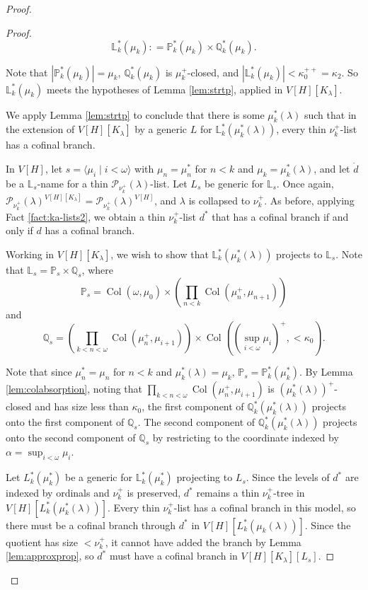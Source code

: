 \documentclass[psamsfonts]{amsart}
\theoremstyle{definition}
\newcommand{\defeq}{\mathrel{\mathop:}=}
\newcommand{\Q}{\mathbb{Q}}
\newcommand{\PP}{\mathbb{P}}
\newcommand{\LL}{\mathbb{L}}
\newcommand{\la}{\lambda}
\newcommand{\ka}{\kappa}
\newcommand{\w}{\omega}
\newcommand{\mc}{\mathcal}
\DeclareMathOperator{\Coll}{Col}
\numberwithin{equation}{section}
\begin{document}
\begin{proof}
\begin{proof}
		\[\LL^*_k(\mu_k) \defeq \PP^*_k(\mu_k) \times \Q^*_k(\mu_k).\]
		
		Note that $|\PP^*_{k}(\mu_k)| = \mu_k$, $\Q^*_k(\mu_k)$ is $\mu_k^+$-closed, and $|\LL^*_k(\mu_k)| < \ka_0^{++} = \ka_2$. So $\LL^*_k(\mu_k)$ meets the hypotheses of Lemma \ref{lem:strtp}, applied in $V[H][K_\la]$.
		
		We apply Lemma \ref{lem:strtp} to conclude that there is some $\mu^*_k(\la)$ such that in the extension of $V[H][K_\la]$ by a generic $L$ for $\LL^*_k(\mu^*_k(\la))$, every thin $\nu_k^+$-list has a cofinal branch.
		
		In $V[H]$, let $s = \langle \mu_i \mid i<\w\rangle$ with $\mu_n = \mu_n^*$ for $n < k$ and $\mu_k = \mu_k^*(\la)$, and let $\dot{d}$ be a $\LL_s$-name for a thin $\mc{P}_{\nu_k^+}(\la)$-list. Let $L_s$ be generic for $\LL_s$. Once again, $\mc{P}_{\nu_k^+}(\la)^{V[H][K_\la]}=\mc{P}_{\nu_k^+}(\la)^{V[H]}$, and $\la$ is collapsed to $\nu_k^+$. As before, applying Fact \ref{fact:ka-lists2}, we obtain a thin $\nu_k^+$-list $d^*$ that has a cofinal branch if and only if $d$ has a cofinal branch.
		
		Working in $V[H][K_\la]$, we wish to show that $\LL^*_k(\mu^*_k(\la))$ projects to $\LL_s$. Note that $\LL_s = \PP_s \times \Q_s$, where
		\[\PP_s = \Coll(\w, \mu_0) \times \left(\prod_{n<k} \Coll(\mu_{n}^+, \mu_{n+1})\right)\]
		and
		\[\Q_s = \left(\prod_{k<n<\w} \Coll(\mu_{n}^+, \mu_{i+1})\right)\times \Coll\left((\sup_{i<\w}\mu_i)^+, <\ka_0\right).\]
		
		Note that since $\mu^*_n = \mu_n$ for $n < k$ and $\mu^*_k(\la) = \mu_k$, $\PP_{s} = \PP^*_k(\mu^*_k)$.
		By Lemma \ref{lem:colabsorption}, noting that $\prod_{k<n<\w} \Coll(\mu_{n}^+, \mu_{i+1})$ is $(\mu^*_k(\la))^+$-closed and has size less than $\ka_0$, the first component of $\Q^*_k(\mu^*_k(\la))$ projects onto the first component of $\Q_s$. The second component of $\Q_k^*(\mu^*_k(\la))$ projects onto the second component of $\Q_s$ by restricting to the coordinate indexed by $\alpha = \sup_{i<\w}\mu_i$.
		
		Let $L_k^*(\mu_k^*)$ be a generic for $\LL_k^*(\mu_k^*)$ projecting to $L_s$. Since the levels of $d^*$ are indexed by ordinals and $\nu^+_k$ is preserved, $d^*$ remains a thin $\nu_k^+$-tree in $V[H][L^*_k(\mu^*_k(\la))]$. Every thin $\nu_k^+$-list has a cofinal branch in this model, so there must be a cofinal branch through $d^*$ in $V[H][L^*_k(\mu_k(\la))]$. Since the quotient has size $<\nu_k^+$, it cannot have added the branch by Lemma \ref{lem:approxprop}, so $d^*$ must have a cofinal branch in $V[H][K_\la][L_s]$.
		

\end{proof}
\end{proof}
\end{document}
